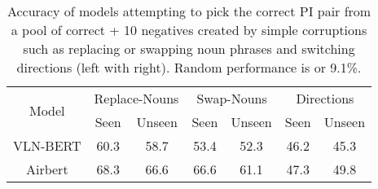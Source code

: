 \RequirePackage[dvipsnames,table]{xcolor} \documentclass[10pt,twocolumn,letterpaper]{article}
\newcommand{\vlnbert}{VLN-BERT}
\newcommand{\airbert}{Airbert}
\begin{document}
\begin{table}[t]
\centering
\small
\tabcolsep=0.08cm
\begin{tabular}{c cc cc cc}
\toprule
\multirow{2}{*}{Model} &
  \multicolumn{2}{c}{Replace-Nouns} &
  \multicolumn{2}{c}{Swap-Nouns} &
  \multicolumn{2}{c}{Directions} \\
& Seen & Unseen
  & Seen & Unseen
  & Seen & Unseen \\
\midrule
\vlnbert
    & 60.3 & 58.7
    & 53.4 & 52.3
    & 46.2 & 45.3 \\
    
\airbert
    & 68.3 & 66.6
    & 66.6 & 61.1
    & 47.3 & 49.8 \\
\bottomrule
\end{tabular}
\vspace{-2mm}
\caption{Accuracy of models attempting to pick the correct PI pair
from a pool of correct + 10 negatives created by simple corruptions such as replacing or swapping noun phrases and switching directions (left with right).
Random performance is  or 9.1\%.}
\vspace{-2mm}
\label{tab:analysis}
\end{table}
\end{document}
